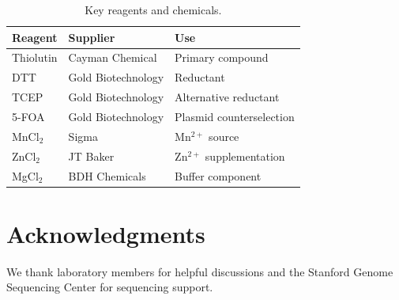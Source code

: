 \documentclass[11pt,a4paper]{article}
\begin{document}
\begin{table}[htbp]
\centering
\caption{Key reagents and chemicals.}
\label{tab:reagents}
\begin{tabular}{lll}
\toprule
\textbf{Reagent} & \textbf{Supplier} & \textbf{Use} \\
\midrule
Thiolutin & Cayman Chemical & Primary compound \\
DTT & Gold Biotechnology & Reductant \\
TCEP & Gold Biotechnology & Alternative reductant \\
5-FOA & Gold Biotechnology & Plasmid counterselection \\
MnCl$_2$ & Sigma & Mn$^{2+}$ source \\
ZnCl$_2$ & JT Baker & Zn$^{2+}$ supplementation \\
MgCl$_2$ & BDH Chemicals & Buffer component \\
\bottomrule
\end{tabular}
\end{table}

\section*{Acknowledgments}
We thank laboratory members for helpful discussions and the Stanford Genome Sequencing Center for sequencing support.


\end{document}
